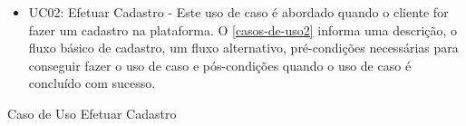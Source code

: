 
\begin{itemize}
	\item UC02: Efetuar Cadastro - Este uso de caso é abordado quando o cliente for fazer um cadastro na plataforma. O 	\autoref{casos-de-uso2} informa uma descrição, o fluxo básico de cadastro, um fluxo alternativo, pré-condições necessárias para conseguir fazer o uso de caso e pós-condições quando o uso de caso é concluído com sucesso. \\
\end{itemize}


\begin{quadro}[htb]
	\centering
	\ABNTEXfontereduzida
	\caption[Caso de Uso Efetuar Cadastro]{Caso de Uso Efetuar Cadastro}
	\label{casos-de-uso2}
\end{quadro}
